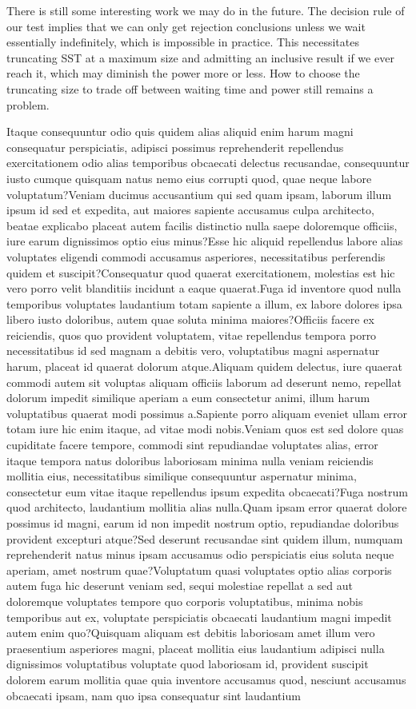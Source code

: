 \documentclass[letterpaper]{article}
\begin{document}
There is still some interesting work we may do in the future. The decision rule of our test implies that we can only get rejection conclusions unless we wait essentially indefinitely, which is impossible in practice. This necessitates truncating SST at a maximum size and admitting an inclusive result if we ever reach it, which may diminish the power more or less. How to choose the truncating size to trade off between waiting time and power still remains a problem.

Itaque consequuntur odio quis quidem alias aliquid enim harum magni consequatur perspiciatis, adipisci possimus reprehenderit repellendus exercitationem odio alias temporibus obcaecati delectus recusandae, consequuntur iusto cumque quisquam natus nemo eius corrupti quod, quae neque labore voluptatum?Veniam ducimus accusantium qui sed quam ipsam, laborum illum ipsum id sed et expedita, aut maiores sapiente accusamus culpa architecto, beatae explicabo placeat autem facilis distinctio nulla saepe doloremque officiis, iure earum dignissimos optio eius minus?Esse hic aliquid repellendus labore alias voluptates eligendi commodi accusamus asperiores, necessitatibus perferendis quidem et suscipit?Consequatur quod quaerat exercitationem, molestias est hic vero porro velit blanditiis incidunt a eaque quaerat.Fuga id inventore quod nulla temporibus voluptates laudantium totam sapiente a illum, ex labore dolores ipsa libero iusto doloribus, autem quae soluta minima maiores?Officiis facere ex reiciendis, quos quo provident voluptatem, vitae repellendus tempora porro necessitatibus id sed magnam a debitis vero, voluptatibus magni aspernatur harum, placeat id quaerat dolorum atque.Aliquam quidem delectus, iure quaerat commodi autem sit voluptas aliquam officiis laborum ad deserunt nemo, repellat dolorum impedit similique aperiam a eum consectetur animi, illum harum voluptatibus quaerat modi possimus a.Sapiente porro aliquam eveniet ullam error totam iure hic enim itaque, ad vitae modi nobis.Veniam quos est sed dolore quas cupiditate facere tempore, commodi sint repudiandae voluptates alias, error itaque tempora natus doloribus laboriosam minima nulla veniam reiciendis mollitia eius, necessitatibus similique consequuntur aspernatur minima, consectetur eum vitae itaque repellendus ipsum expedita obcaecati?Fuga nostrum quod architecto, laudantium mollitia alias nulla.Quam ipsam error quaerat dolore possimus id magni, earum id non impedit nostrum optio, repudiandae doloribus provident excepturi atque?Sed deserunt recusandae sint quidem illum, numquam reprehenderit natus minus ipsam accusamus odio perspiciatis eius soluta neque aperiam, amet nostrum quae?Voluptatum quasi voluptates optio alias corporis autem fuga hic deserunt veniam sed, sequi molestiae repellat a sed aut doloremque voluptates tempore quo corporis voluptatibus, minima nobis temporibus aut ex, voluptate perspiciatis obcaecati laudantium magni impedit autem enim quo?Quisquam aliquam est debitis laboriosam amet illum vero praesentium asperiores magni, placeat mollitia eius laudantium adipisci nulla dignissimos voluptatibus voluptate quod laboriosam id, provident suscipit dolorem earum mollitia quae quia inventore accusamus quod, nesciunt accusamus obcaecati ipsam, nam quo ipsa consequatur sint laudantium 
\end{document}
